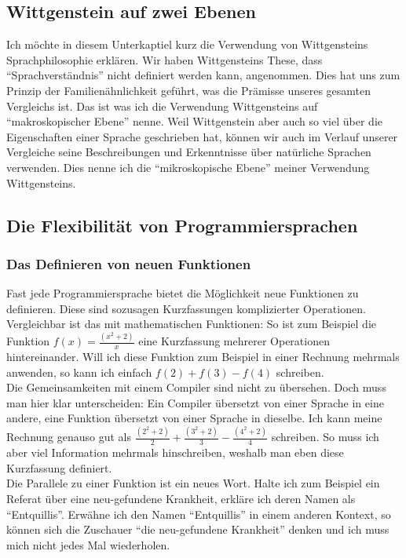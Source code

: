 \documentclass[10pt,a4paper]{article}
\begin{document}
\subsection{Wittgenstein auf zwei Ebenen}
Ich möchte in diesem Unterkaptiel kurz die Verwendung von Wittgensteins Sprachphilosophie erklären. Wir haben Wittgensteins These, dass \enquote{Sprachverständnis} nicht definiert werden kann, angenommen. Dies hat uns zum Prinzip der Familienähnlichkeit geführt, was die Prämisse unseres gesamten Vergleichs ist. Das ist was ich die Verwendung Wittgensteins auf \enquote{makroskopischer Ebene} nenne.
Weil Wittgenstein aber auch so viel über die Eigenschaften einer Sprache geschrieben hat, können wir auch im Verlauf unserer Vergleiche seine Beschreibungen und Erkenntnisse über natürliche Sprachen verwenden. Dies nenne ich die \enquote{mikroskopische Ebene} meiner Verwendung Wittgensteins.


\subsection{Die Flexibilität von Programmiersprachen}
\subsubsection{Das Definieren von neuen Funktionen}
Fast jede Programmiersprache bietet die Möglichkeit neue Funktionen zu definieren. Diese sind sozusagen Kurzfassungen komplizierter Operationen. Vergleichbar ist das mit mathematischen Funktionen: So ist zum Beispiel die Funktion $f(x) = \frac{(x^2 + 2)}{x}$ eine Kurzfassung mehrerer Operationen hintereinander. Will ich diese Funktion zum Beispiel in einer Rechnung mehrmals anwenden, so kann ich einfach $f(2) + f(3) - f(4)$ schreiben. \\
Die Gemeinsamkeiten mit einem Compiler sind nicht zu übersehen. Doch muss man hier klar unterscheiden: Ein Compiler übersetzt von einer Sprache in eine andere, eine Funktion übersetzt von einer Sprache in dieselbe. Ich kann meine Rechnung genauso gut als $\frac{(2^2 + 2)}{2} + \frac{(3^2 + 2)}{3} - \frac{(4^2 + 2)}{4}$ schreiben. So muss ich aber viel Information mehrmals hinschreiben, weshalb man eben diese Kurzfassung definiert. \\
Die Parallele zu einer Funktion ist ein neues Wort. Halte ich zum Beispiel ein Referat über eine neu-gefundene Krankheit, erkläre ich deren Namen als \enquote{Entquillis}. Erwähne ich den Namen \enquote{Entquillis} in einem anderen Kontext, so können sich die Zuschauer \enquote{die neu-gefundene Krankheit} denken und ich muss mich nicht jedes Mal wiederholen.
\end{document}
